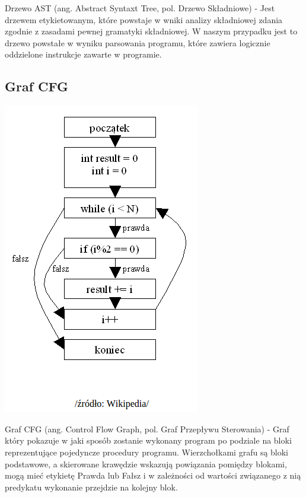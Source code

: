 \documentclass[a4paper,twoside,openright,11pt]{report}
\begin{document}
\par Drzewo AST (ang. Abstract Syntaxt Tree, pol. Drzewo Składniowe) - Jest drzewem etykietowanym, które powstaje w wniki analizy składniowej zdania zgodnie z zasadami pewnej gramatyki składniowej. W naszym przypadku jest to drzewo powstałe w wyniku parsowania programu, które zawiera logicznie oddzielone instrukcje zawarte w programie.



  \subsection {Graf CFG}
\begin{center}
  \includegraphics[scale=0.5]{cfg}
\end{center}
  
\par Graf CFG (ang. Control Flow Graph, pol. Graf Przepływu Sterowania) - Graf który pokazuje w jaki sposób zostanie wykonany program po podziale na bloki reprezentujące pojedyncze procedury programu. Wierzchołkami grafu są bloki podstawowe, a skierowane krawędzie wskazują powiązania pomiędzy blokami, mogą mieć etykietę Prawda lub Fałsz i w zależności od wartości związanego z nią predykatu wykonanie przejdzie na kolejny blok.
\end{document}
